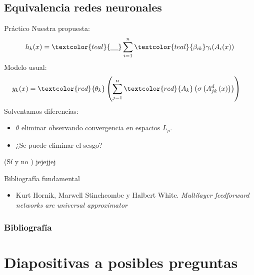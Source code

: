 \documentclass{beamer}
\begin{document}
\subsection{Equivalencia redes neuronales}
\begin{frame}{Práctico}
    Nuestra propuesta: 
    \begin{align*}
                h_k(x) = 
                \textcolor{teal}{\underline{\hspace{0.4cm}}}\sum_{i=1}^{n} \textcolor{teal}{\beta_{i k}} \gamma_{i}( A_{i}(x))
    \end{align*}
    Modelo usual:
    \begin{align*}
        y_k(x) &= 
        \textcolor{red}{\theta_k}
        \left( 
            \sum^n_{j=1} \textcolor{red}{A_{k}}
            \left(
                \sigma 
                \left(
                    A^{d}_{j k}
                    \left(
                        x
                    \right)
                \right)
            \right)
        \right)
    \end{align*}
    Solventamos diferencias: 
    \begin{itemize}
        \item $\theta$ eliminar observando convergencia en espacios $L_p$.
        \item ¿Se puede eliminar el sesgo?
    \end{itemize}
    (Sí y no ) jejejjej
\end{frame}
\begin{frame}{Bibliografía fundamental}
    \begin{itemize}
        \item Kurt Hornik, Marwell Stinchcombe y Halbert White. \textit{Multilayer feedforward networks are universal approximator}
    \end{itemize}
    
\end{frame}

\begin{frame}
    \frametitle{Bibliografía}
    \printbibliography
    
\end{frame}

\section*{Diapositivas a posibles preguntas}
\end{document}
